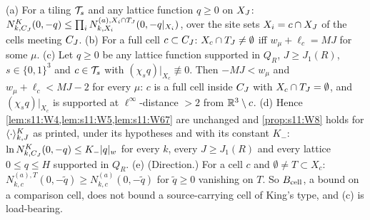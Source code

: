\begin{lemma}\label{lem:s04:E}
\textup{(a)} For a tiling $\mathcal T_s$ and any lattice function $q\ge0$ on $X_J$: $N^K_{k,C_J}(0,-q)\le\prod_iN^{(a),X_i\cap T_J}_{k,X_i}(0,-q|_{X_i})$, over the site sets $X_i=c\cap X_J$ of the cells meeting $C_J$.
\textup{(b)} For a full cell $c\subset C_J$: $X_c\cap T_J\ne\emptyset$ iff $w_\mu+\ell_c=MJ$ for some $\mu$.
\textup{(c)} Let $q\ge0$ be any lattice function supported in $Q_R$, $J\ge J_1(R)$, $s\in\{0,1\}^3$ and $c\in\mathcal T_s$ with $(\chi_sq)|_{X_c}\not\equiv0$. Then $-MJ<w_\mu$ and $w_\mu+\ell_c<MJ-2$ for every $\mu$: $c$ is a full cell inside $C_J$ with $X_c\cap T_J=\emptyset$, and $(\chi_sq)|_{X_c}$ is supported at $\ell^\infty$-distance $>2$ from $\mathbb R^3\setminus c$.
\textup{(d)} Hence \cref{lem:s11:W4,lem:s11:W5,lem:s11:W67} are unchanged and \cref{prop:s11:W8} holds for $\langle \cdot\rangle^{K}_{k,J}$ as printed, under its hypotheses and with its constant $K_-$: $\ln N^K_{k,C_J}(0,-q)\le K_-\lvert q\rvert_{w}$ for every $k$, every $J\ge J_1(R)$ and every lattice $0\le q\le H$ supported in $Q_R$.
\textup{(e)} (Direction.) For a cell $c$ and $\emptyset\ne T\subset X_c$: $N^{(a),T}_{k,c}(0,-\tilde q)\ge N^{(a)}_{k,c}(0,-\tilde q)$ for $\tilde q\ge0$ vanishing on $T$. So $B_{\rm cell}$, a bound on a comparison cell, does not bound a source-carrying cell of King's type, and \textup{(c)} is load-bearing.
\end{lemma}

